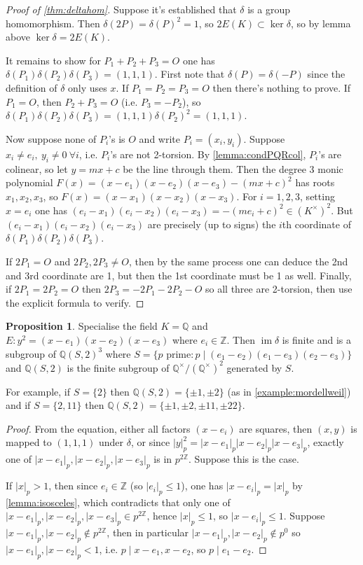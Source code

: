 \documentclass{article}
\newcommand{\Z}{\mathbb{Z}}
\newcommand{\Q}{\mathbb{Q}}
\newcommand{\im}{\operatorname{im}}
\theoremstyle{definition}
\newtheorem{prop}[defn]{Proposition}
\begin{document}
\begin{proof}[Proof of \ref{thm:deltahom}]
Suppose it's established that $\delta$ is a group homomorphism. Then $\delta(2P)=\delta(P)^2=1$, so $2E(K)\subset\ker\delta$, so by lemma above $\ker\delta=2E(K)$.

It remains to show for $P_1+P_2+P_3=O$ one has $\delta(P_1)\delta(P_2)\delta(P_3)=(1,1,1)$. First note that $\delta(P)=\delta(-P)$ since the definition of $\delta$ only uses $x$. If $P_1=P_2=P_3=O$ then there's nothing to prove. If $P_1=O$, then $P_2+P_3=O$ (i.e. $P_3=-P_2$), so $\delta(P_1)\delta(P_2)\delta(P_3)=(1,1,1)\delta(P_2)^2=(1,1,1)$.

Now suppose none of $P_i$'s is $O$ and write $P_i=(x_i,y_i)$. Suppose $x_i\neq e_i,\ y_i\neq 0 \ \forall i$, i.e. $P_i$'s are not 2-torsion. By \ref{lemma:condPQRcol}, $P_i$'s are colinear, so let $y=mx+c$ be the line through them. Then the degree 3 monic polynomial $F(x)=(x-e_1)(x-e_2)(x-e_3)-(mx+c)^2$ has roots $x_1,x_2,x_3$, so $F(x)=(x-x_1)(x-x_2)(x-x_3)$. For $i=1,2,3$, setting $x=e_i$ one has $(e_i-x_1)(e_i-x_2)(e_i-x_3)=-(me_i+c)^2\in (K^\times)^2$. But $(e_i-x_1)(e_i-x_2)(e_i-x_3)$ are precisely (up to signs) the $i$th coordinate of $\delta(P_1)\delta(P_2)\delta(P_3)$.

If $2P_1=O$ and $2P_2,2P_3\neq O$, then by the same process one can deduce the 2nd and 3rd coordinate are 1, but then the 1st coordinate must be 1 as well. Finally, if $2P_1=2P_2=O$ then $2P_3=-2P_1-2P_2-O$ so all three are 2-torsion, then use the explicit formula to verify.
\end{proof}

\begin{prop}
\label{prop:imdeltaisfin}
Specialise the field $K=\Q$ and $E:y^2=(x-e_1)(x-e_2)(x-e_3)$ where $e_i\in\Z$. Then $\im\delta$ is finite and is a subgroup of $\Q(S,2)^3$ where $S=\{p\text{ prime}:p\mid(e_1-e_2)(e_1-e_3)(e_2-e_3)\}$ and $\Q(S,2)$ is the finite subgroup of $\Q^\times/(\Q^\times)^2$ generated by $S$.

For example, if $S=\{2\}$ then $\Q(S,2)=\{\pm 1,\pm 2\}$ (as in \ref{example:mordellweil}) and if $S=\{2,11\}$ then $\Q(S,2)=\{\pm 1,\pm 2,\pm 11,\pm 22\}$.
\end{prop}
\begin{proof}
From the equation, either all factors $(x-e_i)$ are squares, then $(x,y)$ is mapped to $(1,1,1)$ under $\delta$, or since $|y|_p^2=|x-e_1|_p|x-e_2|_p|x-e_3|_p$, exactly one of $|x-e_1|_p,|x-e_2|_p,|x-e_3|_p$ is in $p^{2\Z}$. Suppose this is the case.

If $|x|_p>1$, then since $e_i\in\Z$ (so $|e_i|_p\leq 1$), one has $|x-e_i|_p=|x|_p$ by \ref{lemma:isosceles}, which contradicts that only one of $|x-e_1|_p,|x-e_2|_p,|x-e_3|_p\in p^{2\Z}$, hence $|x|_p\leq 1$, so $|x-e_i|_p\leq 1$. Suppose $|x-e_1|_p,|x-e_2|_p\notin p^{2\Z}$, then in particular $|x-e_1|_p,|x-e_2|_p\notin p^0$ so $|x-e_1|_p,|x-e_2|_p<1$, i.e. $p\mid x-e_1,x-e_2$, so $p\mid e_1-e_2$.
\end{proof}
\end{document}
